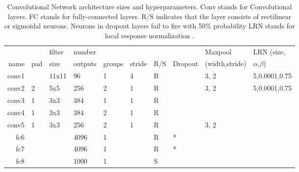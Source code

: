 \begin{table}[t]
\caption{Convolutional Network architecture sizes and hyperparameters. Conv stands for Convolutional layers. FC stands for fully-connected layers. R/S indicates that the layer consists of rectilinear or sigmoidal neurons. Neurons in dropout layers fail to fire with 50\% probability  \citep{Hinton-et-al-arxiv2012} LRN stands for local response normalization \citep{Krizhevsky-2012}.}
\label{tab:network_architecture}
\begin{center}
\begin{tabular}{|r|l|l|l|l|l|l|l|l|l|}
\hline
       &      & filter & number  &        &        &     &         & Maxpool        & LRN (size,        \\
name   & pad  & size   & outputs & groups & stride & R/S & Dropout & (width,stride) & $\alpha$,$\beta$) \\
\hline
conv1  &      & 11x11  & 96      & 1      & 4      & R   &         & 3, 2           & 5,0.0001,0.75     \\
conv2  & 2    & 5x5    & 256     & 2      & 1      & R   &         & 3, 2           & 5,0.0001,0.75     \\
conv3  & 1    & 3x3    & 384     & 1      & 1      & R   &         &                &                   \\
conv4  & 1    & 3x3    & 384     & 2      & 1      & R   &         &                &                   \\
conv5  & 1    & 3x3    & 256     & 2      & 1      & R   &         & 3, 2           &                   \\
fc6    &      &        & 4096    & 1      &        & R   & *       &                &                   \\
fc7    &      &        & 4096    & 1      &        & R   & *       &                &                   \\
fc8    &      &        & 1000    & 1      &        & S   &         &                &                   \\
\hline
\end{tabular}
\end{center}
\end{table}




